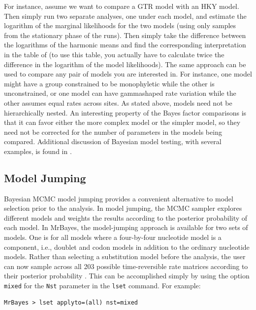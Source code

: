 \documentclass[12pt]{book}
\newcommand{\ttt}[1]{\texttt{#1}}
\begin{document}
For instance, assume we want to compare a GTR model with an HKY model. Then simply run two separate
analyses, one under each model, and estimate the logarithm of the marginal likelihoods for the two
models (using only samples from the stationary phase of the runs). Then simply take the difference
between the logarithms of the harmonic means and find the corresponding interpretation in the table
of \citet{kass95} (to use this table, you actually have to calculate twice the difference in the
logarithm of the model likelihoods). The same approach can be used to compare any pair of models
you are interested in. For instance, one model might have a group constrained to be monophyletic
while the other is unconstrained, or one model can have gammashaped rate variation while the other
assumes equal rates across sites. As stated above, models need not be hierarchically nested. An
interesting property of the Bayes factor comparisons is that it can favor either the more complex
model or the simpler model, so they need not be corrected for the number of parameters in the
models being compared. Additional discussion of Bayesian model testing, with several examples, is
found in \citet{nylander04}.


\subsection{Model Jumping}
\label{modelJumping}
Bayesian MCMC model jumping provides a convenient alternative to model selection prior to the
analysis. In model jumping, the MCMC sampler explores different models and weights the results
according to the posterior probability of each model. In MrBayes, the model-jumping approach is
available for two sets of models. One is for all models where a four-by-four nucleotide model is a
component, i.e., doublet and codon models in addition to the ordinary nucleotide models.  Rather
than selecting a substitution model before the analysis, the user can now sample across all 203
possible time-reversible rate matrices according to their posterior probability
\citep{huelsenbeck04d}. This can be accomplished simply by using the option \ttt{mixed} for the
\ttt{Nst} parameter in the \ttt{lset} command. For example:

\footnotesize
\begin{singlespacing}
\begin{verbatim}
MrBayes > lset applyto=(all) nst=mixed
\end{verbatim}
\end{singlespacing}
\normalsize
\end{document}
